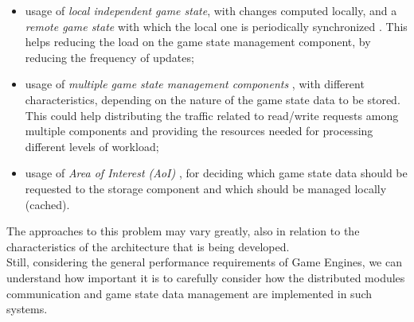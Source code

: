 \begin{itemize}
	\item usage of \textit{local independent game state}, with changes computed locally, and a \textit{remote game state} with which the local one is periodically synchronized \cite{womak:distributed-architecture-interactive-multiplayer}. This helps reducing the load on the game state management component, by reducing the frequency of updates;
	\item usage of \textit{multiple game state management components} \cite{womak:multiplayer-distributed-state}, with different characteristics, depending on the nature of the game state data to be stored. This could help distributing the traffic related to read/write requests among multiple components and providing the resources needed for processing different levels of workload;
	\item usage of \textit{Area of Interest (AoI)} \cite{womak:distributed-minecraft, womak:distributed-architecture-interactive-multiplayer}, for deciding which game state data should be requested to the storage component and which should be managed locally (cached).
\end{itemize}
The approaches to this problem may vary greatly, also in relation to the characteristics of the architecture that is being developed. \\
Still, considering the general performance requirements of Game Engines, we can understand how important it is to carefully consider how the distributed modules communication and game state data management are implemented in such systems.